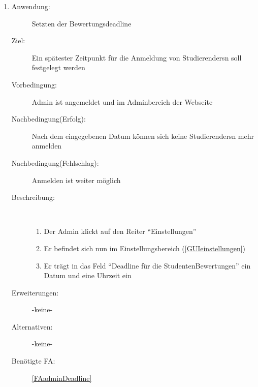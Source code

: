 \documentclass[parskip=full]{scrartcl}
\newcommand{\swtLabel}[1]{\textbf{/#1\arabic*0/}}
\begin{document}
\begin{enumerate} [label=\swtLabel{A}]
	\item \label{UCadminDeadline}
	\begin{description}
		\item[Anwendung:] Setzten der \gls{Bewertung}sdeadline
		\item[Ziel:] Ein spätester Zeitpunkt für die Anmeldung von \glspl{Studierender}n soll festgelegt werden
		\item[Vorbedingung:] \gls{Admin} ist angemeldet und im \gls{Admin}bereich der Webseite
		\item[Nachbedingung(Erfolg):] Nach dem eingegebenen Datum können sich keine \glspl{Studierender}n mehr anmelden
		\item[Nachbedingung(Fehlschlag):] Anmelden ist weiter möglich
		\item[Beschreibung:]~
		\begin{enumerate}[label=\arabic*.]
			\item Der \gls{Admin} klickt auf den Reiter \enquote{Einstellungen}
			\item Er befindet sich nun im Einstellungsbereich (\autoref{GUIeinstellungen})
			\item Er trägt in das Feld \enquote{Deadline für die Studenten\gls{Bewertung}en}
			ein Datum und eine Uhrzeit ein
		\end{enumerate}
		\item[Erweiterungen:] -keine-
		\item[Alternativen:] -keine-
		\item[Benötigte FA:] \ref{FAadminDeadline}
	\end{description}
	

\end{enumerate}
\end{document}
